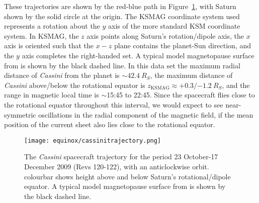 These trajectories are shown by the red-blue path in Figure~\ref{equinox:fig:cassinitrajectory}, with Saturn shown by the solid circle at the origin. The KSMAG coordinate system used represents a rotation about the $y$ axis of the more standard KSM coordinate system. In KSMAG, the $z$ axis points along Saturn's rotation/dipole axis, the $x$ axis is oriented such that the $x-z$ plane contains the planet-Sun direction, and the $y$ axis completes the right-handed set. A typical model magnetopause surface from \citet{pilkington2015} is shown by the black dashed line. In this data set the maximum radial distance of \textit{Cassini} from the planet is ${\sim}\SI{42.4}{R_S}$, the maximum distance of \textit{Cassini} above/below the rotational equator is $z_\mathrm{KSMAG}\approx +0.3/\SI{-1.2}{R_S}$, and the range in magnetic local time is ${\sim}$15:45 to 22:45. Since the spacecraft flies close to the rotational equator throughout this interval, we would expect to see near-symmetric oscillations in the radial component of the magnetic field, if the mean position of the current sheet also lies close to the rotational equator.
\begin{figure}
\centering
\texttt{[image: equinox/cassinitrajectory.png]}
\caption[\textit{Cassini} spacecraft trajectory for 23 October – 17 December 2009.]{The \textit{Cassini} spacecraft trajectory for the period 23 October{\--}17 December 2009 (Revs 120{\--}122), with an anticlockwise orbit. colourbar shows height above and below Saturn's rotational/dipole equator. A typical model magnetopause surface from \citet{pilkington2015} is shown by the black dashed line.}
\label{equinox:fig:cassinitrajectory}
\end{figure}

